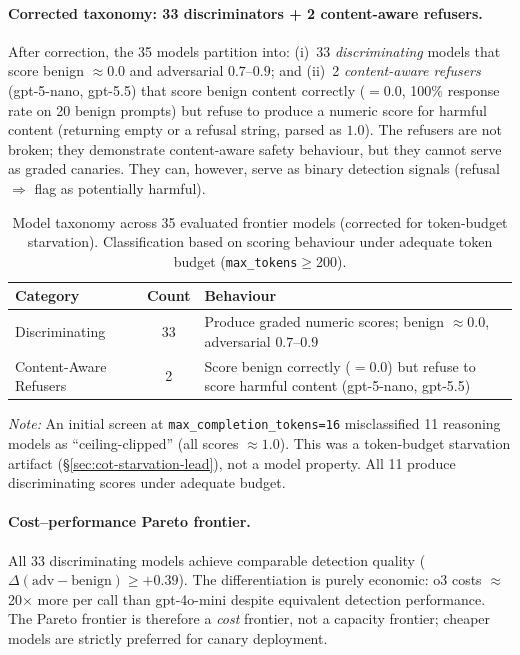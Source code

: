 \paragraph{Corrected taxonomy: 33 discriminators + 2 content-aware refusers.} After correction, the 35 models partition into: (i)~33 \emph{discriminating} models that score benign $\approx 0.0$ and adversarial $0.7$--$0.9$; and (ii)~2 \emph{content-aware refusers} (gpt-5-nano, gpt-5.5) that score benign content correctly ($= 0.0$, 100\% response rate on 20 benign prompts) but refuse to produce a numeric score for harmful content (returning empty or a refusal string, parsed as $1.0$). The refusers are not broken; they demonstrate content-aware safety behaviour, but they cannot serve as graded canaries. They can, however, serve as binary detection signals (refusal $\Rightarrow$ flag as potentially harmful).

\begin{table}[h]
\centering
\small
\caption{Model taxonomy across 35 evaluated frontier models (corrected for token-budget starvation). Classification based on scoring behaviour under adequate token budget (\texttt{max\_tokens}$\geq$200).}
\label{tab:model-taxonomy}
\begin{tabular}{lcp{6.5cm}}
\toprule
\textbf{Category} & \textbf{Count} & \textbf{Behaviour} \\
\midrule
Discriminating & 33 & Produce graded numeric scores; benign $\approx 0.0$, adversarial $0.7$--$0.9$ \\
Content-Aware Refusers & 2 & Score benign correctly ($=0.0$) but refuse to score harmful content (gpt-5-nano, gpt-5.5) \\
\bottomrule
\end{tabular}
\vspace{2pt}

{\footnotesize \textit{Note:} An initial screen at \texttt{max\_completion\_tokens=16} misclassified 11 reasoning models as ``ceiling-clipped'' (all scores $\approx 1.0$). This was a token-budget starvation artifact (\S\ref{sec:cot-starvation-lead}), not a model property. All 11 produce discriminating scores under adequate budget.}
\end{table}

\paragraph{Cost--performance Pareto frontier.} All 33 discriminating models achieve comparable detection quality ($\Delta(\text{adv} - \text{benign}) \geq +0.39$). The differentiation is purely economic: o3 costs $\approx$20$\times$ more per call than gpt-4o-mini despite equivalent detection performance. The Pareto frontier is therefore a \emph{cost} frontier, not a capacity frontier; cheaper models are strictly preferred for canary deployment.


